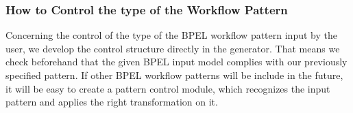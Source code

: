 \subsubsection{How to Control the type of the Workflow Pattern}
Concerning the control of the type of the BPEL workflow pattern input by the user, we develop the control structure directly in the generator. That means we check beforehand that the given BPEL input model complies with our previously specified pattern.
If other BPEL workflow patterns will be include in the future, it will be easy to create a pattern control module, which recognizes the input pattern and applies the right transformation on it.